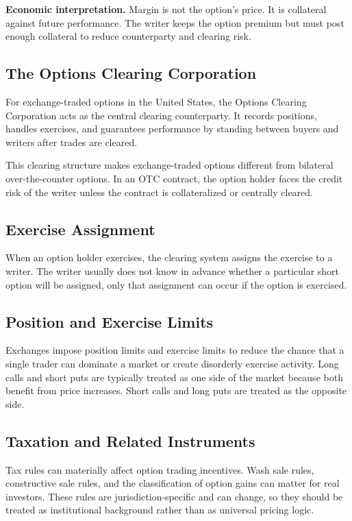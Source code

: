 \begin{boxF}
\textbf{Economic interpretation.} Margin is not the option's price. It is
collateral against future performance. The writer keeps the option premium but
must post enough collateral to reduce counterparty and clearing risk.
\end{boxF}

\subsection{The Options Clearing Corporation}

For exchange-traded options in the United States, the Options Clearing
Corporation acts as the central clearing counterparty. It records positions,
handles exercises, and guarantees performance by standing between buyers and
writers after trades are cleared.

This clearing structure makes exchange-traded options different from bilateral
over-the-counter options. In an OTC contract, the option holder faces the credit
risk of the writer unless the contract is collateralized or centrally cleared.

\subsection{Exercise Assignment}

When an option holder exercises, the clearing system assigns the exercise to a
writer. The writer usually does not know in advance whether a particular short
option will be assigned, only that assignment can occur if the option is
exercised.

\subsection{Position and Exercise Limits}

Exchanges impose position limits and exercise limits to reduce the chance that a
single trader can dominate a market or create disorderly exercise activity.
Long calls and short puts are typically treated as one side of the market
because both benefit from price increases. Short calls and long puts are treated
as the opposite side.

\subsection{Taxation and Related Instruments}

Tax rules can materially affect option trading incentives. Wash sale rules,
constructive sale rules, and the classification of option gains can matter for
real investors. These rules are jurisdiction-specific and can change, so they
should be treated as institutional background rather than as universal pricing
logic.

